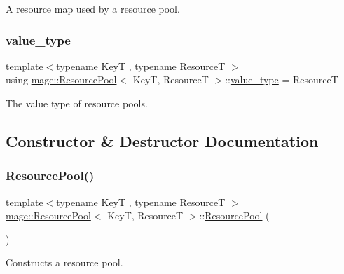 A resource map used by a resource pool. \mbox{\label{classmage_1_1_resource_pool_a5297ef9d8f854a606391ace5a9746a85}} 
\subsubsection{\texorpdfstring{value\+\_\+type}{value\_type}}
{\footnotesize\ttfamily template$<$typename KeyT , typename ResourceT $>$ \\
using \mbox{\hyperlink{classmage_1_1_resource_pool}{mage\+::\+Resource\+Pool}}$<$ KeyT, ResourceT $>$\+::\mbox{\hyperlink{classmage_1_1_resource_pool_a5297ef9d8f854a606391ace5a9746a85}{value\+\_\+type}} =  ResourceT}

The value type of resource pools. 

\subsection{Constructor \& Destructor Documentation}
\mbox{\label{classmage_1_1_resource_pool_a94aff142869744ed48fb1b426face48b}} 
\subsubsection{\texorpdfstring{Resource\+Pool()}{ResourcePool()}\hspace{0.1cm}{\footnotesize\ttfamily [1/3]}}
{\footnotesize\ttfamily template$<$typename KeyT , typename ResourceT $>$ \\
\mbox{\hyperlink{classmage_1_1_resource_pool}{mage\+::\+Resource\+Pool}}$<$ KeyT, ResourceT $>$\+::\mbox{\hyperlink{classmage_1_1_resource_pool}{Resource\+Pool}} (\begin{DoxyParamCaption}{ }\end{DoxyParamCaption})\hspace{0.3cm}{\ttfamily [default]}}

Constructs a resource pool. \mbox{\label{classmage_1_1_resource_pool_ad1cc0cf98317e65900879b85625f10ac}} 
